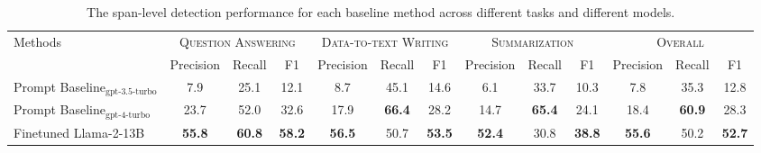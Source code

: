 \begin{table}[!ht]
\scriptsize
\centering
    \begin{tabular}{l|ccccccccc|ccc}
    \toprule
    \multirow{2}{*}{Methods} & \multicolumn{3}{c}{\textsc{Question Answering}} & \multicolumn{3}{c}{\textsc{Data-to-text Writing}} & \multicolumn{3}{c}{\textsc{Summarization}} & \multicolumn{3}{c}{\textsc{Overall}}\\
     \cmidrule(lr){2-4} \cmidrule(lr){5-7} \cmidrule(lr){8-10}  \cmidrule(lr){11-13}
     & Precision & Recall & F1  & Precision & Recall & F1  & Precision & Recall & F1 & Precision & Recall & F1 \\
     \midrule
     Prompt Baseline$_\textrm{gpt-3.5-turbo}$ & 7.9 & 25.1 & 12.1 & 8.7 & 45.1 & 14.6 & 6.1 & 33.7  & 10.3 & 7.8 & 35.3 & 12.8 \\
     Prompt Baseline$_\textrm{gpt-4-turbo}$& 23.7& 52.0 & 32.6  & 17.9 & \textbf{66.4} & 28.2 & 14.7 & \textbf{65.4} & 24.1 & 18.4 & \textbf{60.9} & 28.3\\
     Finetuned Llama-2-13B & \textbf{55.8} & \textbf{60.8} & \textbf{58.2} & \textbf{56.5} & 50.7 & \textbf{53.5} & \textbf{52.4} & 30.8 & \textbf{38.8} & \textbf{55.6} & 50.2 & \textbf{52.7}\\
    \bottomrule
    \end{tabular}
    \caption{The span-level detection performance for each baseline method across different tasks and different models. 
    }
    \label{tab:2-span-result}
\end{table}